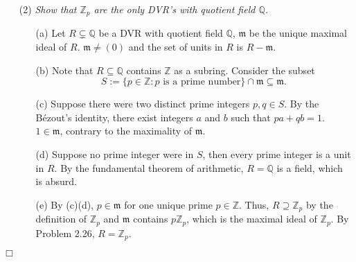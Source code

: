 \documentclass{article}
\begin{document}
\begin{enumerate}
\item[(2)]
  \emph{Show that $\mathbb{Z}_p$ are the only DVR's with quotient field $\mathbb{Q}$.}
  \begin{enumerate}
  \item[(a)]
    Let $R \subsetneq \mathbb{Q}$ be a DVR with quotient field $\mathbb{Q}$,
    $\mathfrak{m}$ be the unique maximal ideal of $R$.
    $\mathfrak{m} \neq (0)$ and the set of units in $R$ is $R - \mathfrak{m}$.

  \item[(b)]
    Note that $R \subseteq \mathbb{Q}$ contains $\mathbb{Z}$ as a subring.
    Consider the subset
    \[
      S := \{ p \in \mathbb{Z} : \text{$p$ is a prime number} \} \cap \mathfrak{m}
      \subseteq \mathfrak{m}.
    \]

  \item[(c)]
    Suppose there were two distinct prime integers $p, q \in S$.
    By the B\'ezout's identity, there exist integers $a$ and $b$ such that $pa + qb = 1$.
    $1 \in \mathfrak{m}$, contrary to the maximality of $\mathfrak{m}$.

  \item[(d)]
    Suppose no prime integer were in $S$, then every prime integer is a unit in $R$.
    By the fundamental theorem of arithmetic, $R = \mathbb{Q}$ is a field, which is absurd.

  \item[(e)]
    By (c)(d), $p \in \mathfrak{m}$ for one unique prime $p \in \mathbb{Z}$.
    Thus, $R \supseteq \mathbb{Z}_p$ by the definition of $\mathbb{Z}_p$
    and $\mathfrak{m}$ contains $p\mathbb{Z}_p$,
    which is the maximal ideal of $\mathbb{Z}_p$.
    By Problem 2.26, $R = \mathbb{Z}_p$.
  \end{enumerate}
\end{enumerate}
$\Box$ \\\\



\end{document}
